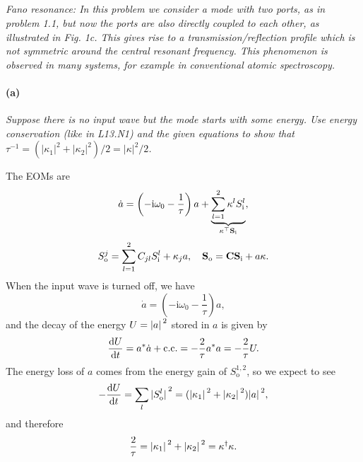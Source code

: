 \documentclass[hyperref, a4paper]{article}
\newcommand*{\ii}{\mathrm{i}}
\newcommand*{\Si}[1]{S_{\text{i#1}}}
\newcommand*{\So}[1]{S_{\text{o#1}}}
\begin{document}
\subsection{}

\textit{Fano resonance: In this problem we consider a mode with two ports, as in problem 1.1, but now the ports are also directly coupled to each other, as illustrated in Fig. 1c. This gives rise to a transmission/reflection profile which is not symmetric around the central resonant frequency. This phenomenon is observed in many systems, for example in conventional atomic spectroscopy.}

\paragraph*{(a)} \textit{Suppose there is no input wave but the mode starts with some energy. Use energy conservation (like in L13.N1) and the given equations to show that $\tau^{-1}=\left(\left|\kappa_1\right|^2+\left|\kappa_2\right|^2\right) / 2=|\kappa|^2 / 2$.} 

The EOMs are
\begin{equation}
    \dot{a} = \left( - \ii \omega_0 - \frac{1}{\tau} \right) a 
    + \underbrace{\sum_{l=1}^{2} \kappa^l \Si{}^l}_{\vb{\kappa}^\top \vb{\Si{}}}, 
\end{equation}
\begin{equation}
    \So{}^j = \sum_{l=1}^{2} C_{jl} \Si{}^l + \kappa_j a, \quad 
    \vb{\So{}} = \vb{C} \vb{\Si{}} + a \vb{\kappa}.
\end{equation}
When the input wave is turned off, we have 
\begin{equation}
    \dot{a} = \left( - \ii \omega_0 - \frac{1}{\tau} \right) a,
\end{equation}
and the decay of the energy $U = \abs*{a}^2$ stored in $a$ is given by 
\begin{equation}
    \dv{U}{t} = a^* \dot{a} + \text{c.c.}
    = - \frac{2}{\tau} a^* a = - \frac{2}{\tau} U.
\end{equation}
The energy loss of $a$ comes from the energy gain of $\So{}^{1,2}$, so we expect to see 
\begin{equation}
    - \dv{U}{t} = \sum_l \abs*{\So{}^l}^2 = (\abs*{\kappa_1}^2 + \abs*{\kappa_2}^2) \abs*{a}^2, 
\end{equation}
and therefore 
\begin{equation}
    \frac{2}{\tau} = \abs*{\kappa_1}^2 + \abs*{\kappa_2}^2
    = \vb{\kappa}^\dagger \vb{\kappa} .
\end{equation}
\end{document}
